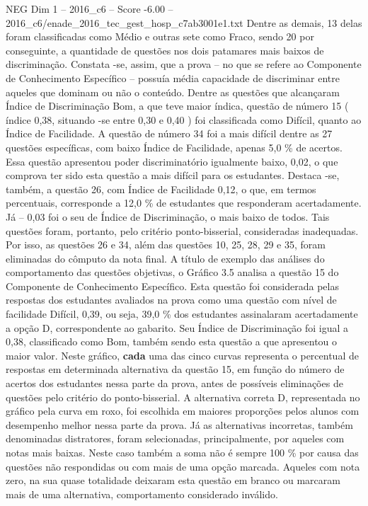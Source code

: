 \begin{textsample}{NEG Dim 1 – 2016\_c6 – Score -6.00 – 2016\_c6/enade\_2016\_tec\_gest\_hosp\_c7ab3001e1.txt}
Dentre as demais, 13 delas foram classificadas como Médio e outras sete como Fraco, sendo 20 por conseguinte, a quantidade de questões nos dois patamares mais baixos de discriminação.
Constata -se, assim, que a prova – no que se refere ao Componente de Conhecimento Específico – possuía média capacidade de discriminar entre aqueles que dominam ou não o conteúdo.
Dentre as questões que alcançaram Índice de Discriminação Bom, a que teve maior índica, questão de número 15 ( índice 0,38, situando -se entre 0,30 e 0,40 ) foi classificada como Difícil, quanto ao Índice de Facilidade.
A questão de número 34 foi a mais difícil dentre as 27 questões específicas, com baixo Índice de Facilidade, apenas 5,0 \% de acertos.
Essa questão apresentou poder discriminatório igualmente baixo, 0,02, o que comprova ter sido esta questão a mais difícil para os estudantes.
Destaca -se, também, a questão 26, com Índice de Facilidade 0,12, o que, em termos percentuais, corresponde a 12,0 \% de estudantes que responderam acertadamente.
Já – 0,03 foi o seu de Índice de Discriminação, o mais baixo de todos.
Tais questões foram, portanto, pelo critério ponto-bisserial, consideradas inadequadas.
Por isso, as questões 26 e 34, além das questões 10, 25, 28, 29 e 35, foram eliminadas do cômputo da nota final.
A título de exemplo das análises do comportamento das questões objetivas, o Gráfico 3.5 analisa a questão 15 do Componente de Conhecimento Específico.
Esta questão foi considerada pelas respostas dos estudantes avaliados na prova como uma questão com nível de facilidade Difícil, 0,39, ou seja, 39,0 \% dos estudantes assinalaram acertadamente a opção D, correspondente ao gabarito.
Seu Índice de Discriminação foi igual a 0,38, classificado como Bom, também sendo esta questão a que apresentou o maior valor.
Neste gráfico, \textbf{cada} uma das cinco curvas representa o percentual de respostas em determinada alternativa da questão 15, em função do número de acertos dos estudantes nessa parte da prova, antes de possíveis eliminações de questões pelo critério do ponto-bisserial.
A alternativa correta D, representada no gráfico pela curva em roxo, foi escolhida em maiores proporções pelos alunos com desempenho melhor nessa parte da prova.
Já as alternativas incorretas, também denominadas distratores, foram selecionadas, principalmente, por aqueles com notas mais baixas.
Neste caso também a soma não é sempre 100 \% por causa das questões não respondidas ou com mais de uma opção marcada.
Aqueles com nota zero, na sua quase totalidade deixaram esta questão em branco ou marcaram mais de uma alternativa, comportamento considerado inválido.

\end{textsample}
